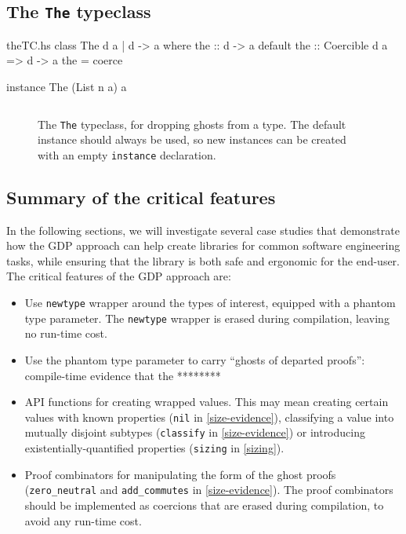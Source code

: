 \documentclass[format=sigplan, review=false, screen=true]{acmart}
\begin{document}
\subsection{The \texttt{The} typeclass}
\begin{filecontents*}{theTC.hs}
class The d a | d -> a where
    the :: d -> a
    default the :: Coercible d a => d -> a
    the = coerce
    
instance The (List n a) a
\end{filecontents*}

\begin{figure}
  \inputminted{haskell}{theTC.hs}
  \caption{The \texttt{The} typeclass, for dropping ghosts
    from a type. The default instance should always be used,
    so new instances can be created with an empty
    \texttt{instance} declaration.}
\end{figure}

\subsection{Summary of the critical features}
In the following sections, we will investigate several case studies that
demonstrate how the GDP approach can help create libraries for common
software engineering tasks, while ensuring that the library is both
safe and ergonomic for the end-user. The critical features of the GDP
approach are:

\begin{itemize}
\item Use \texttt{newtype} wrapper around the types of interest, equipped with a phantom
  type parameter. The \texttt{newtype} wrapper is erased during compilation, leaving no run-time cost.
\item Use the phantom type parameter to carry ``ghosts of departed proofs'': compile-time evidence
  that the ********
\item API functions for creating wrapped values. This may mean creating certain values with
  known properties (\texttt{nil} in \cref{size-evidence}), classifying a value into
  mutually disjoint subtypes (\texttt{classify} in \cref{size-evidence})
  or introducing existentially-quantified properties (\texttt{sizing} in \cref{sizing}).
\item Proof combinators for manipulating the form of the ghost proofs (\texttt{zero\_neutral}
  and \texttt{add\_commutes} in \cref{size-evidence}). The proof combinators should be
  implemented as coercions that are erased during compilation, to avoid any run-time cost.
\end{itemize}
\end{document}
